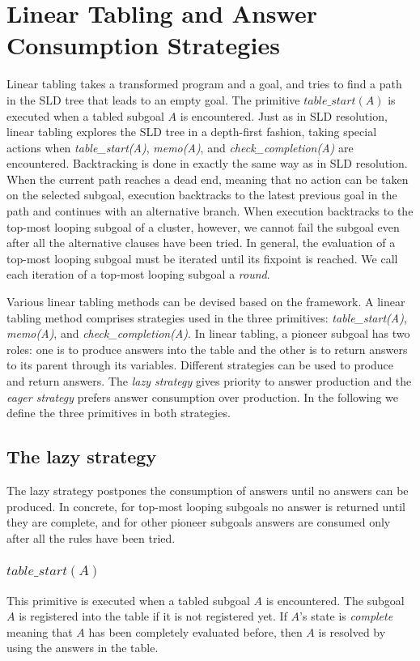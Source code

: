 \documentclass{tlp}
\begin{document}
\section{Linear Tabling and Answer Consumption Strategies}
Linear tabling takes a transformed program and a goal, and tries to find a path in the SLD tree that leads to an empty goal. The primitive $table\_start(A)$ is executed when a tabled subgoal $A$ is encountered. Just as in SLD resolution, linear tabling explores the SLD tree in a depth-first fashion, taking special actions when {\it table\_start(A)}, {\it memo(A)}, and {\it check\_completion(A)} are encountered.  Backtracking is done in exactly the same way as in SLD resolution. When the current path reaches a dead end, meaning that no action can be taken on the selected subgoal, execution backtracks to the latest previous goal in the path and continues with an alternative branch. When execution backtracks to the top-most looping subgoal of a cluster, however, we cannot fail the subgoal even after all the alternative clauses have been tried. In general, the evaluation of a top-most looping subgoal must be iterated until its fixpoint is reached. We call each iteration of a top-most looping subgoal a {\it round}.

Various linear tabling methods can be devised based on the framework. A linear tabling method comprises strategies used in the three primitives: {\it table\_start(A)}, {\it memo(A)}, and {\it check\_completion(A)}. In linear tabling, a pioneer subgoal has two roles: one is to produce answers into the table and the other is to return answers to its parent through its variables. Different strategies can be used to produce and return answers. The {\it lazy strategy} gives priority to answer production and the {\it eager strategy} prefers answer consumption over production. In the following we define the three primitives in both strategies.

\subsection{\label{subsection:lazy}The lazy strategy}
The lazy strategy postpones the consumption of answers until no answers can be produced. In concrete, for top-most looping subgoals no answer is returned until they are complete, and for other pioneer subgoals answers are consumed only after all the rules have been tried.


\subsubsection{$table\_start(A)$}
This primitive is executed when a tabled subgoal $A$ is encountered. The subgoal $A$ is registered into the table if it is not registered yet. If $A$'s state is {\it complete} meaning that $A$ has been completely evaluated before, then $A$ is resolved by using the answers in the table. 
\end{document}
